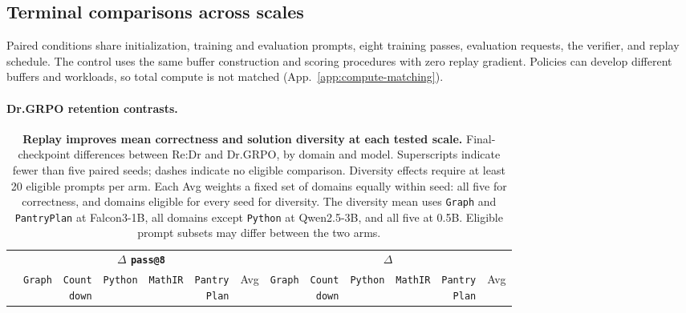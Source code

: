 \subsection{Terminal comparisons across scales}
\label{app:scale-matrix}
\label{app:scale-snapshot}
\label{app:maxrl-scale-extensions}
\label{app:current-campaign-results}

Paired conditions share initialization, training and evaluation prompts,
eight training passes, evaluation requests, the verifier, and replay schedule.
The control uses the same buffer construction and scoring procedures with
zero replay gradient. Policies can develop different buffers and workloads,
so total compute is not matched (App.~\ref{app:compute-matching}).

\crossscaletablematerial

\paragraph{Dr.GRPO retention contrasts.}
\label{app:retention-numerical-detail}

\begin{table}[!tbp]
  \centering
  \caption{\textbf{Replay improves mean correctness and solution diversity at each tested scale.}
  Final-checkpoint differences between Re:Dr and Dr.GRPO, by domain and
  model. Superscripts indicate fewer than five paired seeds; dashes indicate
  no eligible comparison. Diversity effects require at least 20 eligible
  prompts per arm. Each Avg weights a fixed set of domains equally within
  seed: all five for correctness, and domains eligible for every seed for
  diversity. The diversity mean uses \texttt{Graph} and \texttt{PantryPlan}
  at Falcon3-1B, all domains except \texttt{Python} at Qwen2.5-3B, and all
  five at 0.5B. Eligible prompt subsets may differ between the two arms.}

\label{tab:cross-scale-terminal-effects}
  \scriptsize
  \setlength{\tabcolsep}{1.4pt}
  \renewcommand{\arraystretch}{0.92}
  \begin{tabular}{@{}l*{12}{r}@{}}
    \toprule
    & \multicolumn{6}{c}{\textbf{$\Delta$ \texttt{pass@8}}}
      & \multicolumn{6}{c}{\textbf{$\Delta$ \pmd{}}} \\
    \cmidrule(lr){2-7}\cmidrule(l){8-13}
    & \texttt{Graph} & \shortstack{\texttt{Count}\\\texttt{down}} & \texttt{Python} & \texttt{MathIR} & \shortstack{\texttt{Pantry}\\\texttt{Plan}} & Avg
      & \texttt{Graph} & \shortstack{\texttt{Count}\\\texttt{down}} & \texttt{Python} & \texttt{MathIR} & \shortstack{\texttt{Pantry}\\\texttt{Plan}} & Avg \\
    \midrule
    
  \end{tabular}
\end{table}

